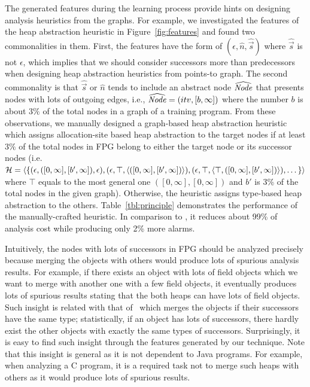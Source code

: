 The generated features during the learning process provide hints on designing analysis heuristics from the graphs.
For example, we investigated the features of the heap abstraction heuristic in Figure~\ref{fig:features} and found two commonalities in them.
First,  the features have the form of $(\epsilon,\hat{n}, \hat{\vec{s}})$ where $\hat{\vec{s}}$ is not $\epsilon$,
which implies that we should consider successors more than predecessors when designing heap abstraction heuristics from points-to graph.
The second commonality is that $\hat{\vec{s}}$ or $\hat{n}$ tends to include an abstract
node $\widehat{\it Node}$ that presents nodes with lots of outgoing edges, i.e., $\widehat{\it Node} =
(itv,[b,\infty])$ where the number $b$ is about $3\%$ of the total nodes in a graph of a training program.
From these observations, we manually designed a graph-based heap abstraction heuristic which
assigns allocation-site based heap abstraction to the target nodes
if at least $3\%$ of the total nodes in FPG belong to either the target node or its successor nodes
(i.e. $\mathcal{H} = \langle \{ (\epsilon,([0,\infty],[b',\infty]),\epsilon)
	,(\epsilon,\top,\langle ([0,\infty],[b',\infty]) \rangle)
	,(\epsilon,\top,\langle \top,([0,\infty],[b',\infty]) \rangle)
	,\dots
	\}
 \rangle$ where $\top$ equals to the most general one $([0,\infty],[0,\infty])$ and $b'$ is 3\% of the total nodes in the given graph).
Otherwise, the heuristic assigns type-based heap abstraction to the others.
Table~\ref{tbl:principle} demonstrates the performance of the manually-crafted heuristic.
In comparison to \AllocBased, it reduces about 99\% of analysis cost while producing only 2\% more alarms.



Intuitively, the nodes with lots of successors in FPG should be analyzed precisely because merging the objects with others would produce lots of spurious analysis results.
For example, if there exists an object with lots of field objects which we want to merge with another one with a few field objects,
it eventually produces lots of spurious results stating that the both heaps can have lots of field objects.
Such insight is related with that of \Mahjong~which merges the objects if their successors have the same type;
statistically, if an object has lots of successors, there hardly exist the other objects with exactly the same types of successors.
Surprisingly, it is easy to find such insight through the features generated by our technique.
Note that this insight is general as it is not dependent to Java programs.
For example, when analyzing a C program, it is a required task not to merge such heaps with others as it would produce lots of spurious results.

